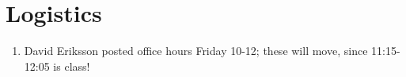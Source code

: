\section{Logistics}

\begin{enumerate}
\item David Eriksson posted office hours Friday 10-12; these will
  move, since 11:15-12:05 is class!
\end{enumerate}
